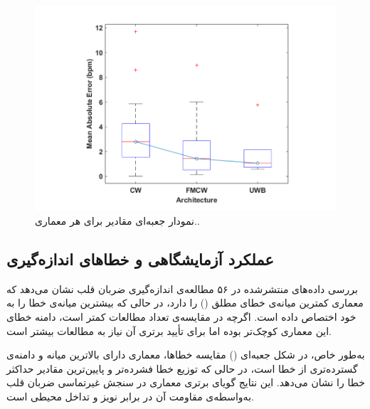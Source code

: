 \begin{figure}[ht]
    \centering
    \includegraphics[width=0.7\linewidth]{Images/chapter3/3-2.png}
    \caption{ نمودار جعبه‌ای مقادیر  برای هر معماری.\cite{frazao2024radar}.}
    \label{fig:fmcw_vitals}
\end{figure}

\subsection{عملکرد آزمایشگاهی و خطاهای اندازه‌گیری}
\label{sec:experimental-performance}

بررسی داده‌های منتشرشده در ۵۶ مطالعه‌ی اندازه‌گیری ضربان قلب نشان می‌دهد که معماری  کمترین میانه‌ی خطای مطلق () را دارد، در حالی که  بیشترین میانه‌ی خطا را به خود اختصاص داده است. اگرچه  در مقایسه‌ی تعداد مطالعات کمتر است، دامنه خطای این معماری کوچک‌تر بوده اما برای تأیید برتری آن نیاز به مطالعات بیشتر است.

به‌طور خاص، در شکل جعبه‌ای () مقایسه خطاها، معماری  دارای بالاترین میانه و دامنه‌ی گسترده‌تری از خطا است، در حالی که  توزیع خطا فشرده‌تر و  پایین‌ترین مقادیر حداکثر خطا را نشان می‌دهد. این نتایج گویای برتری معماری  در سنجش غیرتماسی ضربان قلب به‌واسطه‌ی مقاومت آن در برابر نویز و تداخل محیطی است.


